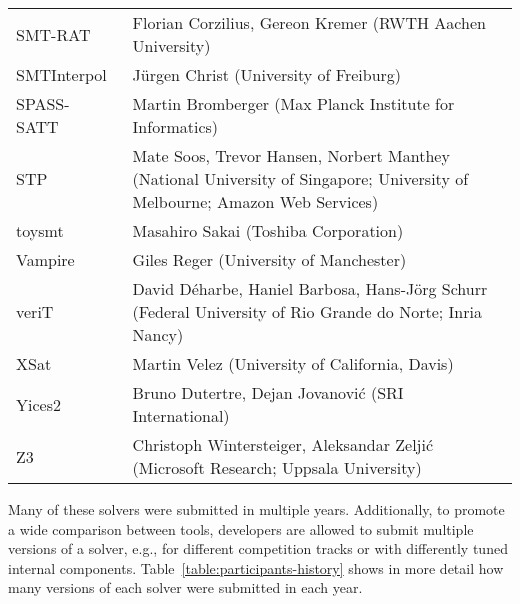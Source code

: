 \documentclass[twoside,11pt]{article}
\begin{document}
\begin{table}
\begin{tabular}{|l|p{11.7cm}|}
    SMT-RAT~\cite{smt-rat} & Florian Corzilius, Gereon Kremer
                        (RWTH Aachen University)\\
    SMTInterpol~\cite{} & J\"urgen Christ
                        (University of Freiburg)\\
    SPASS-SATT~\cite{} & Martin Bromberger
                        (Max Planck Institute for Informatics)\\
    STP~\cite{}        & Mate Soos, Trevor Hansen, Norbert Manthey
                        (National University of Singapore; University of Melbourne; Amazon Web Services)\\
    toysmt~\cite{}     & Masahiro Sakai
                        (Toshiba Corporation)\\
    Vampire~\cite{}    & Giles Reger
                        (University of Manchester)\\
    veriT~\cite{DBLP:conf/cade/BoutonODF09} & David D\'eharbe, Haniel Barbosa, Hans-J\"org Schurr
                        (Federal University of Rio Grande do Norte; Inria Nancy)\\
    XSat~\cite{}       & Martin Velez
                        (University of California, Davis)\\
    Yices2~\cite{}     & Bruno Dutertre, Dejan Jovanovi\'c
                        (SRI International)\\
    Z3~\cite{DBLP:conf/tacas/MouraB08} & Christoph Wintersteiger, Aleksandar Zelji\'c
                        (Microsoft Research; Uppsala University)\\
    \hline
  \end{tabular}
\end{table}

Many of these solvers were submitted in multiple years.  Additionally,
to promote a wide comparison between tools, developers are allowed to
submit multiple versions of a solver, e.g., for different competition
tracks or with differently tuned internal components.
Table~\ref{table:participants-history} shows in more detail how many
versions of each solver were submitted in each year.
\end{document}
